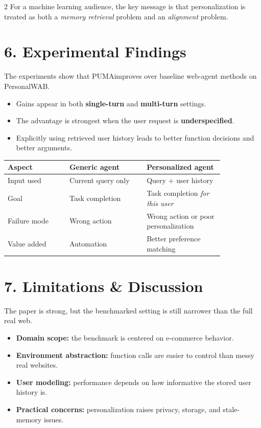 \documentclass{article}
\begin{document}
\begin{multicols}{2}
For a machine learning audience, the key message is that personalization is treated as both a \emph{memory retrieval} problem and an \emph{alignment} problem.

\section*{6. Experimental Findings}
The experiments show that PUMA\@ improves over baseline web-agent methods on PersonalWAB.

\begin{itemize}[leftmargin=1.1em,itemsep=0.2em,topsep=0.2em]
	\item Gains appear in both \textbf{single-turn} and \textbf{multi-turn} settings.
	\item The advantage is strongest when the user request is \textbf{underspecified}.
	\item Explicitly using retrieved user history leads to better function decisions and better arguments.
\end{itemize}

\begin{center}
\footnotesize
\begin{tabular}{@{}p{0.24\linewidth}p{0.30\linewidth}p{0.30\linewidth}@{}}
\toprule
Aspect & Generic agent & Personalized agent \\
\midrule
Input used & Current query only & Query + user history \\
Goal & Task completion & Task completion \emph{for this user} \\
Failure mode & Wrong action & Wrong action or poor personalization \\
Value added & Automation & Better preference matching \\
\bottomrule
\end{tabular}
\normalsize
\end{center}

\section*{7. Limitations \& Discussion}
The paper is strong, but the benchmarked setting is still narrower than the full real web.

\begin{itemize}[leftmargin=1.1em,itemsep=0.2em,topsep=0.2em]
	\item \textbf{Domain scope:} the benchmark is centered on e-commerce behavior.
	\item \textbf{Environment abstraction:} function calls are easier to control than messy real websites.
	\item \textbf{User modeling:} performance depends on how informative the stored user history is.
	\item \textbf{Practical concerns:} personalization raises privacy, storage, and stale-memory issues.
\end{itemize}


\end{multicols}
\end{document}
